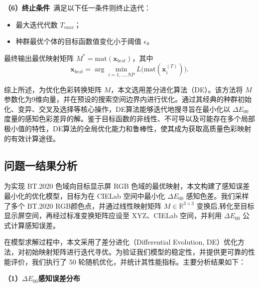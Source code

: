 \noindent\textbf{（6）终止条件}\
满足以下任一条件则终止迭代：
\begin{itemize}
  \item 最大迭代代数 $T_{max}$；
  \item 种群最优个体的目标函数值变化小于阈值 $\epsilon$。
\end{itemize}

最终输出最优映射矩阵 $M^*=\mathrm{mat}(\mathbf{x}_{best})$，其中
\begin{equation}\label{eq:best_solution}
  \mathbf{x}_{best} = \arg\min_{i=1,\dots,NP} L\bigl(\mathrm{mat}(\mathbf{x}_i^{(T)})\bigr).
\end{equation}


综上所述，为优化色彩转换矩阵 $M$，本文选用差分进化算法（DE）。该方法将 $M$ 参数化为9维向量，并在预设的搜索空间边界内进行优化。通过其经典的种群初始化、变异、交叉及选择等核心操作，DE算法能够迭代地搜寻旨在最小化以 $\Delta E_{00}$ 度量的感知色彩差异的解。鉴于目标函数的非线性、不可导以及可能存在多个局部极小值的特性，DE算法的全局优化能力和鲁棒性，使其成为获取高质量色彩映射的有效计算途径。


\subsection[\hspace{-2pt}问题一结果分析]{{\heiti{} \hspace{-8pt}问题一结果分析}}\label{section4: 问题一结果分析}


为实现 BT.2020 色域向目标显示屏 RGB 色域的最优映射，本文构建了感知误差最小化的优化模型，目标为在 CIELab 空间中最小化 $\Delta E_{00}$ 感知色差。我们采样了多个 BT.2020 RGB颜色点，并通过线性映射矩阵 $M\in \mathbb{R}^{3\times 3}$ 变换后,转化至目标显示屏空间，再经过标准变换矩阵应设至 XYZ、CIELab 空间，并利用 $\Delta E_{00}$ 公式计算感知误差。

在模型求解过程中，本文采用了差分进化（Differential Evolution, DE）优化方法，对初始映射矩阵进行迭代寻优。为验证我们模型的稳定性，并提供更可靠的性能评价，我们执行了 50 轮随机优化，并统计其性能指标。主要分析结果如下：

\noindent\textbf{（1）$\Delta E_{00}$感知误差分布}


